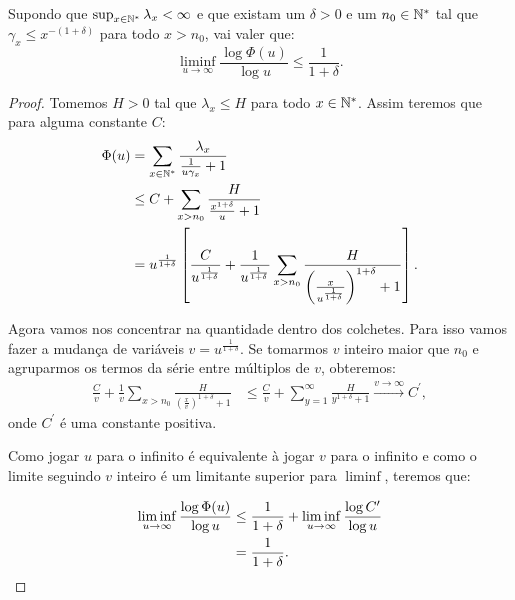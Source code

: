 \begin{proposicao}
  \label{prop:dominar-dim-haus-sup}
  Supondo que $\sup_{x\in{\mathbb{N^*}}}\lambda_x < \infty$ e que existam um
  $\delta>0$ e um $n_0 \in {\mathbb{N^*}}$ tal que $\gamma_x \leq x^{-(1+\delta)}$
  para todo $x > n_0$, vai valer que:
  \begin{equation}
    \liminf_{u \to \infty} \frac{\log \Phi(u)}{\log u}  \leq
    \frac{1}{1+\delta} .
  \end{equation}
\end{proposicao}

\begin{proof}
  Tomemos $H > 0$ tal que $\lambda_x \leq H$ para todo $x \in
  {\mathbb{N^*}}$. Assim teremos que para alguma constante $C$:
  \begin{align*}
    \Phi(u) &= \sum_{x \in {\mathbb{N^*}}} \frac{\lambda_x}{\frac{1}{u\gamma_x} +
      1}\\
    &\leq C + \sum_{x > n_0} \frac{H}{\frac{x^{1+\delta}}{u} + 1}\\
    &=u^{\frac{1}{1+\delta}} \left[
      \frac{C}{u^{\frac{1}{1+\delta}}} +
      \frac{1}{u^{\frac{1}{1+\delta}}} \sum_{x > n_0} \frac{H}{
        \left( \frac{x}{u^{\frac{1}{1+\delta}}}  \right)^{1+\delta}
        + 1
      }
    \right].
  \end{align*}

  Agora vamos nos concentrar na quantidade dentro dos colchetes. Para
  isso vamos fazer a mudança de variáveis $v =
  u^{\frac{1}{1+\delta}}$. Se tomarmos $v$ inteiro maior que $n_0$ e
  agruparmos os termos da série entre múltiplos de $v$, obteremos:
  \begin{align*}
    \frac{C}{v} + \frac{1}{v} \sum_{x > n_0} \frac{H}{ \left(
        \frac{x}{v} \right)^{1+\delta} + 1 }
    &\leq
    \frac{C}{v} + \sum_{y=1}^{\infty} \frac{H}{y^{1+\delta} + 1}
    \xrightarrow{v \to \infty} C^\prime,
  \end{align*}
  onde $C^\prime$ é uma constante positiva.

  Como jogar $u$ para o infinito é equivalente à jogar $v$ para o
  infinito e como o limite seguindo $v$ inteiro é um limitante
  superior para $\liminf$, teremos que:

  \begin{align*}
    \liminf_{u \to \infty} \frac{\log \Phi(u)}{\log u} &\leq
    \frac{1}{1+\delta} + \liminf_{u \to \infty} 
    \frac{\log{C^\prime}}{\log u}\\
    &= \frac{1}{1+\delta} .
    \qedhere
  \end{align*}
\end{proof}

